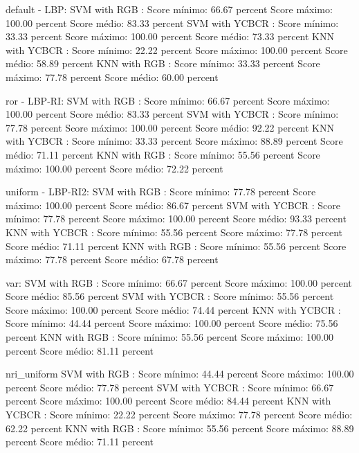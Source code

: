 default - LBP:
SVM with RGB :
Score mínimo: 66.67 percent 
Score máximo: 100.00 percent 
Score médio: 83.33 percent
SVM with YCBCR :
Score mínimo: 33.33 percent 
Score máximo: 100.00 percent 
Score médio: 73.33 percent
KNN with YCBCR :
Score mínimo: 22.22 percent 
Score máximo: 100.00 percent 
Score médio: 58.89 percent
KNN with RGB :
Score mínimo: 33.33 percent 
Score máximo: 77.78 percent 
Score médio: 60.00 percent


ror - LBP-RI:
SVM with RGB :
Score mínimo: 66.67 percent 
Score máximo: 100.00 percent 
Score médio: 83.33 percent
SVM with YCBCR :
Score mínimo: 77.78 percent 
Score máximo: 100.00 percent 
Score médio: 92.22 percent
KNN with YCBCR :
Score mínimo: 33.33 percent 
Score máximo: 88.89 percent 
Score médio: 71.11 percent
KNN with RGB :
Score mínimo: 55.56 percent 
Score máximo: 100.00 percent 
Score médio: 72.22 percent


uniform - LBP-RI2:
SVM with RGB :
Score mínimo: 77.78 percent 
Score máximo: 100.00 percent 
Score médio: 86.67 percent
SVM with YCBCR :
Score mínimo: 77.78 percent 
Score máximo: 100.00 percent 
Score médio: 93.33 percent
KNN with YCBCR :
Score mínimo: 55.56 percent 
Score máximo: 77.78 percent 
Score médio: 71.11 percent
KNN with RGB :
Score mínimo: 55.56 percent 
Score máximo: 77.78 percent 
Score médio: 67.78 percent


var:
SVM with RGB :
Score mínimo: 66.67 percent 
Score máximo: 100.00 percent 
Score médio: 85.56 percent
SVM with YCBCR :
Score mínimo: 55.56 percent 
Score máximo: 100.00 percent 
Score médio: 74.44 percent
KNN with YCBCR :
Score mínimo: 44.44 percent 
Score máximo: 100.00 percent 
Score médio: 75.56 percent
KNN with RGB :
Score mínimo: 55.56 percent 
Score máximo: 100.00 percent 
Score médio: 81.11 percent



nri_uniform 
SVM with RGB :
Score mínimo: 44.44 percent 
Score máximo: 100.00 percent 
Score médio: 77.78 percent
SVM with YCBCR :
Score mínimo: 66.67 percent 
Score máximo: 100.00 percent 
Score médio: 84.44 percent
KNN with YCBCR :
Score mínimo: 22.22 percent 
Score máximo: 77.78 percent 
Score médio: 62.22 percent
KNN with RGB :
Score mínimo: 55.56 percent 
Score máximo: 88.89 percent 
Score médio: 71.11 percent
